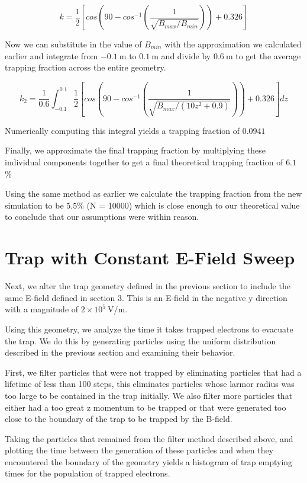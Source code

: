 \documentclass[12pt,letterpaper]{article}
\begin{document}
\[k = \frac{1}{2} \left[ cos\left( 90 - cos^{-1}\left( \frac{1}{\sqrt{B_{max}/B_{min}}} \right) \right) + 0.326  \right] \]
 
Now we can substitute in the value of $B_{min}$ with the approximation we calculated earlier and integrate from $-0.1~$m to $0.1~$m and divide by $0.6~$m to get the average trapping fraction across the entire geometry. 

\[ k_2 = \frac{1}{0.6}\int_{-0.1}^{0.1}\frac{1}{2} \left[ cos\left( 90 - cos^{-1}\left( \frac{1}{\sqrt{B_{max}/(10z^2 + 0.9)}} \right) \right) + 0.326  \right] dz  \]

Numerically computing this integral yields a trapping fraction of $0.0941$

Finally, we approximate the final trapping fraction by multiplying these individual components together to get a final theoretical trapping fraction of $6.1$\%

Using the same method as earlier we calculate the trapping fraction from the new simulation to be $5.5$\% (N = 10000) which is close enough to our theoretical value to conclude that our assumptions were within reason. 

\section{Trap with Constant E-Field Sweep}
Next, we alter the trap geometry defined in the previous section to include the same E-field defined in section 3. This is an E-field in the negative y direction with a magnitude of $2\times10^5~$V/m. 

Using this geometry, we analyze the time it takes trapped electrons to evacuate the trap. We do this by generating particles using the uniform distribution described in the previous section and examining their behavior.

First, we filter particles that were not trapped by eliminating particles that had a lifetime of less than 100 steps, this eliminates particles whose larmor radius was too large to be contained in the trap initially. We also filter more particles that either had a too great z momentum to be trapped or that were generated too close to the boundary of the trap to be trapped by the B-field.

Taking the particles that remained from the filter method described above, and plotting the time between the generation of these particles and when they encountered the boundary of the geometry yields a histogram of trap emptying times for the population of trapped electrons. 
\end{document}
